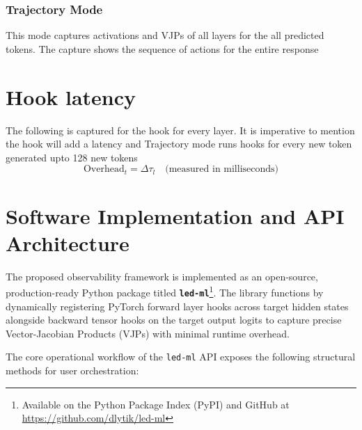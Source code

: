 \documentclass[10pt,conference]{IEEEtran}
\begin{document}
\subsubsection{Trajectory Mode}
This mode captures activations and VJPs of all layers for the all predicted tokens. The capture shows the sequence of actions for the entire response

\section{Hook latency}
The following is captured for the hook for every layer. It is imperative to mention the hook will add a latency and Trajectory mode runs hooks for every new token generated upto 128 new tokens
 \[
    \text{Overhead}_t = \Delta \tau_l \quad \text{(measured in milliseconds)}
 \]

\section{Software Implementation and API Architecture}
\label{sec:software_implementation}

The proposed observability framework is implemented as an open-source, production-ready Python package titled \textbf{\texttt{led-ml}}\footnote{Available on the Python Package Index (PyPI) and GitHub at \url{https://github.com/dlytik/led-ml}}. The library functions by dynamically registering PyTorch forward layer hooks across target hidden states alongside backward tensor hooks on the target output logits to capture precise Vector-Jacobian Products (VJPs) with minimal runtime overhead. 

The core operational workflow of the \texttt{led-ml} API exposes the following structural methods for user orchestration:
\end{document}
